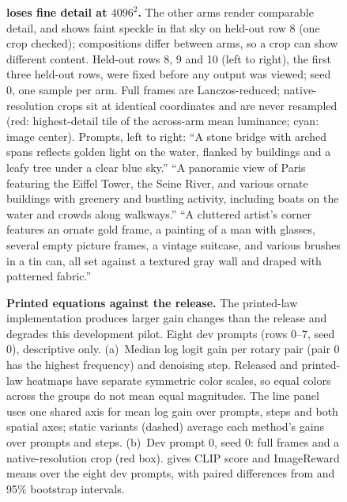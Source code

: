 \begin{figure}[H]
\centering
{}
\caption{\textbf{\ntk{} loses fine detail at $4096^2$.} The other arms render comparable detail, and \dype{} shows faint speckle in flat sky on held-out row 8 (one crop checked); compositions differ between arms, so a crop can show different content. Held-out rows 8, 9 and 10 (left to right), the first three held-out rows, were fixed before any output was viewed; seed 0, one sample per arm. Full frames are Lanczos-reduced; native-resolution crops sit at identical coordinates and are never resampled (red: highest-detail tile of the across-arm mean luminance; cyan: image center). Prompts, left to right: ``A stone bridge with arched spans reflects golden light on the water, flanked by buildings and a leafy tree under a clear blue sky.'' ``A panoramic view of Paris featuring the Eiffel Tower, the Seine River, and various ornate buildings with greenery and bustling activity, including boats on the water and crowds along walkways.'' ``A cluttered artist's corner features an ornate gold frame, a painting of a man with glasses, several empty picture frames, a vintage suitcase, and various brushes in a tin can, all set against a textured gray wall and draped with patterned fabric.''}
\label{fig:qual}
\end{figure}

\begin{table}[H]
\centering
\caption{\textbf{Printed-law scores in the dev pilot.} CLIP score and ImageReward means over the eight dev prompts (rows 0--7, seed 0), with paired differences from \segaofficial{} and 95\% bootstrap intervals (2,000 resamples); descriptive only. Static variants freeze the allocation instead of reading the current latent.  gives the other metrics. Key result: freezing the printed allocation collapses both scores, while freezing the released allocation costs far less.}
\label{tab:papercode_scores}
\footnotesize
\setlength{\tabcolsep}{4pt}

\end{table}

\begin{figure}[H]
\centering
{}
\caption{\textbf{Printed equations against the release.} The printed-law implementation produces larger gain changes than the release and degrades this development pilot. Eight dev prompts (rows 0--7, seed 0), descriptive only. (a)~Median log logit gain per rotary pair (pair 0 has the highest frequency) and denoising step. Released and printed-law heatmaps have separate symmetric color scales, so equal colors across the groups do not mean equal magnitudes. The line panel uses one shared axis for mean log gain over prompts, steps and both spatial axes; static variants (dashed) average each method's gains over prompts and steps. (b)~Dev prompt 0, seed 0: full frames and a native-resolution crop (red box).  gives CLIP score and ImageReward means over the eight dev prompts, with paired differences from \segaofficial{} and 95\% bootstrap intervals.}
\label{fig:papercode}
\end{figure}

